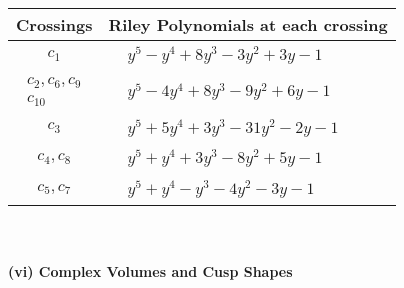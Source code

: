 \documentclass[1p]{elsarticle_modified}
\theoremstyle{definition}
\begin{document}
\begin{tabular}{m{50pt}|m{274pt}}
Crossings & \hspace{64pt}Riley Polynomials at each crossing \\
\hline $$\begin{aligned}c_{1}\end{aligned}$$&$\begin{aligned}
&y^5- y^4+8 y^3-3 y^2+3 y-1
\end{aligned}$\\
\hline $$\begin{aligned}c_{2},c_{6},c_{9}\\c_{10}\end{aligned}$$&$\begin{aligned}
&y^5-4 y^4+8 y^3-9 y^2+6 y-1
\end{aligned}$\\
\hline $$\begin{aligned}c_{3}\end{aligned}$$&$\begin{aligned}
&y^5+5 y^4+3 y^3-31 y^2-2 y-1
\end{aligned}$\\
\hline $$\begin{aligned}c_{4},c_{8}\end{aligned}$$&$\begin{aligned}
&y^5+y^4+3 y^3-8 y^2+5 y-1
\end{aligned}$\\
\hline $$\begin{aligned}c_{5},c_{7}\end{aligned}$$&$\begin{aligned}
&y^5+y^4- y^3-4 y^2-3 y-1
\end{aligned}$\\
\hline
\end{tabular}\\~\\
\newpage\flushleft \textbf{(vi) Complex Volumes and Cusp Shapes}
\end{document}
